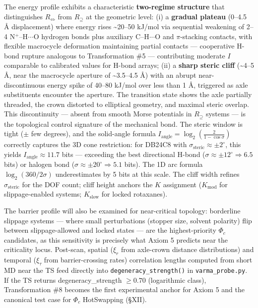 \documentclass[12pt,a4paper]{article}
\begin{document}
The energy profile exhibits a characteristic \textbf{two-regime structure} that distinguishes $R_{\Leftrightarrow}$ from $R_{\supseteq}$ at the geometric level: (i) a \textbf{gradual plateau} (0--4.5 Å displacement) where energy rises \textasciitilde{}20--50 kJ/mol via sequential weakening of 2--4 N$^+$--H$\cdot$$\cdot$$\cdot$O hydrogen bonds plus auxiliary C--H$\cdot$$\cdot$$\cdot$O and $\pi$-stacking contacts, with flexible macrocycle deformation maintaining partial contacts --- cooperative H-bond rupture analogous to Transformation \#5 --- contributing moderate $I$ comparable to calibrated values for H-bond arrays; (ii) a \textbf{sharp steric cliff} (\textasciitilde{}4--5 Å, near the macrocycle aperture of \textasciitilde{}3.5--4.5 Å) with an abrupt near-discontinuous energy spike of 40--80 kJ/mol over less than 1 Å, triggered as axle substituents encounter the aperture. The transition state shows the axle partially threaded, the crown distorted to elliptical geometry, and maximal steric overlap. This discontinuity --- absent from smooth Morse potentials in $R_{\supseteq}$ systems --- is the topological control signature of the mechanical bond. The steric window is tight ($\pm$ few degrees), and the solid-angle formula $I_{\text{angle}} = \log_2\!\left(\tfrac{2}{1-\cos\sigma}\right)$ correctly captures the 3D cone restriction: for DB24C8 with $\sigma_{\text{steric}} \approx \pm 2^{\circ}$, this yields $I_{\text{angle}} \approx 11.7$ bits --- exceeding the best directional H-bond ($\sigma \approx \pm 12^{\circ} \Rightarrow 6.5$ bits) or halogen bond ($\sigma \approx \pm 20^{\circ} \Rightarrow 5.1$ bits). The 1D arc formula $\log_2(360/2\sigma)$ underestimates by 5 bits at this scale. The cliff width refines $\sigma_{\text{steric}}$ for the DOF count; cliff height anchors the $K$ assignment ($K_{\text{mod}}$ for slippage-enabled systems; $K_{\text{slow}}$ for locked rotaxanes).

The barrier profile will also be examined for near-critical topology: borderline slippage systems --- where small perturbations (stopper size, solvent polarity) flip between slippage-allowed and locked states --- are the highest-priority $\Phi_c$ candidates, as this sensitivity is precisely what Axiom 5 predicts near the criticality locus. Post-scan, spatial ($\xi_r$ from axle-crown distance distributions) and temporal ($\xi_\tau$ from barrier-crossing rates) correlation lengths computed from short MD near the TS feed directly into \texttt{degeneracy\_strength()} in \texttt{varma\_probe.py}. If the TS returns degeneracy\_strength $\geq 0.70$ (logarithmic class), Transformation \#8 becomes the first experimental anchor for Axiom 5 and the canonical test case for $\Phi_c$ HotSwapping (§XII).
\end{document}
